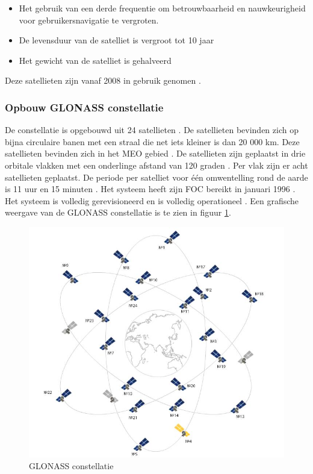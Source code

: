\begin{itemize}
	\item Het gebruik van een derde frequentie om betrouwbaarheid en nauwkeurigheid voor gebruikersnavigatie te vergroten.
	\item De levensduur van de satelliet is vergroot tot 10 jaar
	\item Het gewicht van de satelliet is gehalveerd
\end{itemize}
Deze satellieten zijn vanaf 2008 in gebruik genomen \cite{LBibPPP}.

\subsubsection{Opbouw GLONASS constellatie} 
De constellatie is opgebouwd uit 24 satellieten \cite{LBibGNSS4}. De satellieten bevinden zich op bijna circulaire banen met een straal die net iets kleiner is dan 20 000 km. Deze satellieten bevinden zich in het MEO gebied \cite{LBibMEO}. De satellieten zijn geplaatst in drie orbitale vlakken met een onderlinge afstand van 120 graden \cite{LBibGLONASS2,LBibGNSS6, LBibGNSS8}. Per vlak zijn er acht satellieten geplaatst. De periode per satelliet voor \'e\'en omwentelling rond de aarde is 11 uur en 15 minuten \cite{LBibGNSS6}.  Het systeem heeft zijn FOC bereikt in januari 1996 \cite{LBibGLONASS}. Het systeem is volledig gerevisioneerd en is volledig operationeel \cite{LBibGNSS4}. Een grafische weergave van de GLONASS constellatie is te zien in figuur \ref{imgGLONASS}.

\begin{figure}[hpb]
	\includegraphics[scale=0.5]{GLONASS.jpg}
	\caption{GLONASS constellatie \cite{LImgGLONASS}}
	\label{imgGLONASS}
\end{figure}

